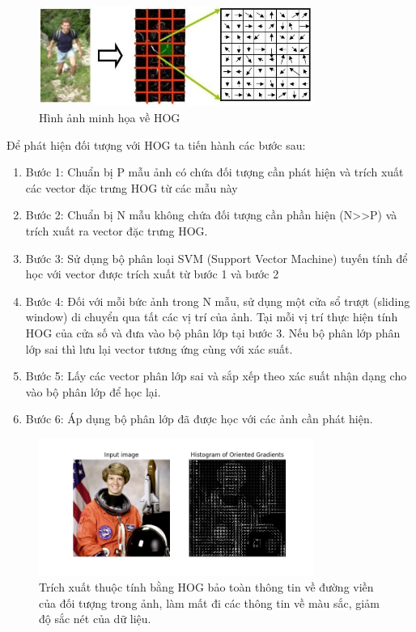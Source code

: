\documentclass[a4paper]{report}
\begin{document}
\begin{figure}[h!]
	\centering
	\includegraphics[width=0.8\textwidth]{2_hog.png}
	\caption{Hình ảnh minh họa về HOG}
\end{figure}

Để phát hiện đối tượng với HOG ta tiến hành các bước sau:
\begin{enumerate}
\item Bước 1: Chuẩn bị P mẫu ảnh có chứa đối tượng cần phát hiện và trích xuất các vector đặc trưng HOG từ các mẫu này
\item Bước 2: Chuẩn bị N mẫu không chứa đối tượng cần phần hiện (N>>P) và trích xuất ra vector đặc trưng HOG.
\item Bước 3: Sử dụng bộ phân loại SVM (Support Vector Machine) tuyến tính để học với vector được trích xuất từ bước 1 và bước 2
\item Bước 4: Đối với mỗi bức ảnh trong N mẫu, sử dụng một cửa sổ trượt (sliding window) di chuyển qua tất các vị trí của ảnh. Tại mỗi vị trí thực hiện tính HOG của cửa số và đưa vào bộ phân lớp tại bước 3. Nếu bộ phân lớp phân lớp sai thì lưu lại vector tương ứng cùng với xác suất.
\item Bước 5: Lấy các vector phân lớp sai và sắp xếp theo xác suất nhận dạng cho vào bộ phân lớp để học lại.
\item Bước 6: Áp dụng bộ phân lớp đã được học với các ảnh cần phát hiện.
\end{enumerate}


\begin{figure}[h!]
	\centering
	\includegraphics[width=0.8\textwidth]{2_hog_.png}
	\caption[Một ví dụ về đầu ra của HOG]{Trích xuất thuộc tính bằng HOG bảo toàn thông tin về đường viền của đối tượng trong ảnh, làm mất đi các thông tin về màu sắc, giảm độ sắc nét của dữ liệu. }
\end{figure}
\end{document}
